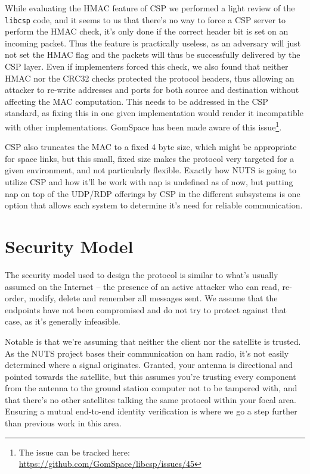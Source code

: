 While evaluating the HMAC feature of CSP we performed a light review of the \texttt{libcsp} code, and it seems to us that there's no way to force a CSP server to perform the HMAC check, it's only done if the correct header bit is set on an incoming packet. Thus the feature is practically useless, as an adversary will just not set the HMAC flag and the packets will thus be successfully delivered by the CSP layer. Even if implementers forced this check, we also found that neither HMAC nor the CRC32 checks protected the protocol headers, thus allowing an attacker to re-write addresses and ports for both source and destination without affecting the MAC computation. This needs to be addressed in the CSP standard, as fixing this in one given implementation would render it incompatible with other implementations. GomSpace has been made aware of this issue\footnote{The issue can be tracked here: \url{https://github.com/GomSpace/libcsp/issues/45}}.

CSP also truncates the MAC to a fixed 4 byte size, which might be appropriate for space links, but this small, fixed size makes the protocol very targeted for a given environment, and not particularly flexible. Exactly how NUTS is going to utilize CSP and how it'll be work with \gls{nap} is undefined as of now, but putting \gls{nap} on top of the UDP/RDP offerings by CSP in the different subsystems is one option that allows each system to determine it's need for reliable communication.


\section{Security Model}

The security model used to design the protocol is similar to what's usually assumed on the Internet -- the presence of an active attacker who can read, re-order, modify, delete and remember all messages sent. We assume that the endpoints have not been compromised and do not try to protect against that case, as it's generally infeasible.

Notable is that we're assuming that neither the client nor the satellite is trusted. As the NUTS project bases their communication on ham radio, it's not easily determined where a signal originates. Granted, your antenna is directional and pointed towards the satellite, but this assumes you're trusting every component from the antenna to the ground station computer not to be tampered with, and that there's no other satellites talking the same protocol within your focal area. Ensuring a mutual end-to-end identity verification is where we go a step further than previous work in this area.


